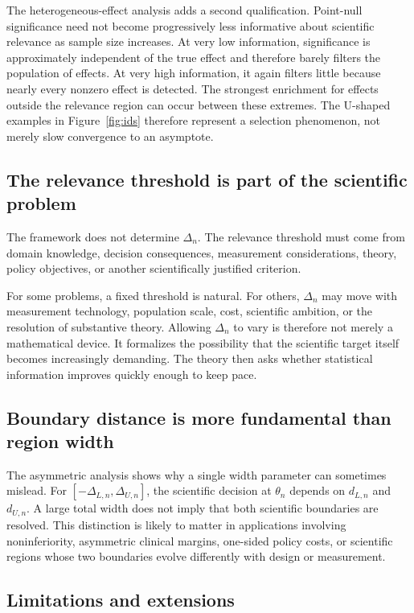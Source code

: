 \documentclass[11pt]{article}
\theoremstyle{remark}
\begin{document}
The heterogeneous-effect analysis adds a second qualification. Point-null significance need not become progressively less informative about scientific relevance as sample size increases. At very low information, significance is approximately independent of the true effect and therefore barely filters the population of effects. At very high information, it again filters little because nearly every nonzero effect is detected. The strongest enrichment for effects outside the relevance region can occur between these extremes. The U-shaped examples in Figure~\ref{fig:ids} therefore represent a selection phenomenon, not merely slow convergence to an asymptote.

\subsection{The relevance threshold is part of the scientific problem}

The framework does not determine $\Delta_n$. The relevance threshold must come from domain knowledge, decision consequences, measurement considerations, theory, policy objectives, or another scientifically justified criterion.

For some problems, a fixed threshold is natural. For others, $\Delta_n$ may move with measurement technology, population scale, cost, scientific ambition, or the resolution of substantive theory. Allowing $\Delta_n$ to vary is therefore not merely a mathematical device. It formalizes the possibility that the scientific target itself becomes increasingly demanding. The theory then asks whether statistical information improves quickly enough to keep pace.

\subsection{Boundary distance is more fundamental than region width}

The asymmetric analysis shows why a single width parameter can sometimes mislead. For $[-\Delta_{L,n},\Delta_{U,n}]$, the scientific decision at $\theta_n$ depends on $d_{L,n}$ and $d_{U,n}$. A large total width does not imply that both scientific boundaries are resolved. This distinction is likely to matter in applications involving noninferiority, asymmetric clinical margins, one-sided policy costs, or scientific regions whose two boundaries evolve differently with design or measurement.

\subsection{Limitations and extensions}
\end{document}
